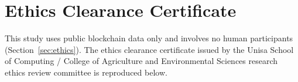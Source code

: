 \section{Ethics Clearance Certificate}
\label{ch:appendix-ethics}


This study uses public blockchain data only and involves no human participants (Section~\ref{sec:ethics}). The ethics clearance certificate issued by the Unisa School of Computing / College of Agriculture and Environmental Sciences research ethics review committee is reproduced below.

\begin{center}
\end{center}
